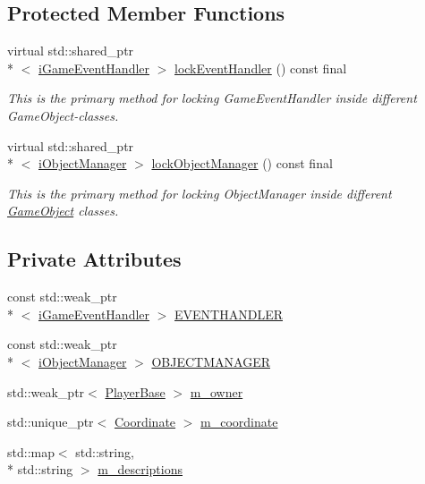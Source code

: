 \subsection*{Protected Member Functions}
\begin{DoxyCompactItemize}
\item 
virtual std\-::shared\-\_\-ptr\\*
$<$ \hyperlink{classCourse_1_1iGameEventHandler}{i\-Game\-Event\-Handler} $>$ \hyperlink{classCourse_1_1GameObject_acca0f382d148f6060a1e9325e3240efc}{lock\-Event\-Handler} () const final
\begin{DoxyCompactList}\small\item\em This is the primary method for locking Game\-Event\-Handler inside different Game\-Object-\/classes. \end{DoxyCompactList}\item 
virtual std\-::shared\-\_\-ptr\\*
$<$ \hyperlink{classCourse_1_1iObjectManager}{i\-Object\-Manager} $>$ \hyperlink{classCourse_1_1GameObject_a64b5e759e0aa4a6fdae9a112718a87e6}{lock\-Object\-Manager} () const final
\begin{DoxyCompactList}\small\item\em This is the primary method for locking Object\-Manager inside different \hyperlink{classCourse_1_1GameObject}{Game\-Object} classes. \end{DoxyCompactList}\end{DoxyCompactItemize}
\subsection*{Private Attributes}
\begin{DoxyCompactItemize}
\item 
const std\-::weak\-\_\-ptr\\*
$<$ \hyperlink{classCourse_1_1iGameEventHandler}{i\-Game\-Event\-Handler} $>$ \hyperlink{classCourse_1_1GameObject_af321898b03674781a97d2d0741522181}{E\-V\-E\-N\-T\-H\-A\-N\-D\-L\-E\-R}
\item 
const std\-::weak\-\_\-ptr\\*
$<$ \hyperlink{classCourse_1_1iObjectManager}{i\-Object\-Manager} $>$ \hyperlink{classCourse_1_1GameObject_ac5517da07a7c75a17bfb89a25e8e242f}{O\-B\-J\-E\-C\-T\-M\-A\-N\-A\-G\-E\-R}
\item 
std\-::weak\-\_\-ptr$<$ \hyperlink{classCourse_1_1PlayerBase}{Player\-Base} $>$ \hyperlink{classCourse_1_1GameObject_a2644bd9e0627fae72f8b7e628e4ee435}{m\-\_\-owner}
\item 
std\-::unique\-\_\-ptr$<$ \hyperlink{classCourse_1_1Coordinate}{Coordinate} $>$ \hyperlink{classCourse_1_1GameObject_a00d58f09e2214089825bf53b58f208b7}{m\-\_\-coordinate}
\item 
std\-::map$<$ std\-::string, \\*
std\-::string $>$ \hyperlink{classCourse_1_1GameObject_a9fb3b852a067d9079ef6ca3677b8fe77}{m\-\_\-descriptions}
\end{DoxyCompactItemize}
